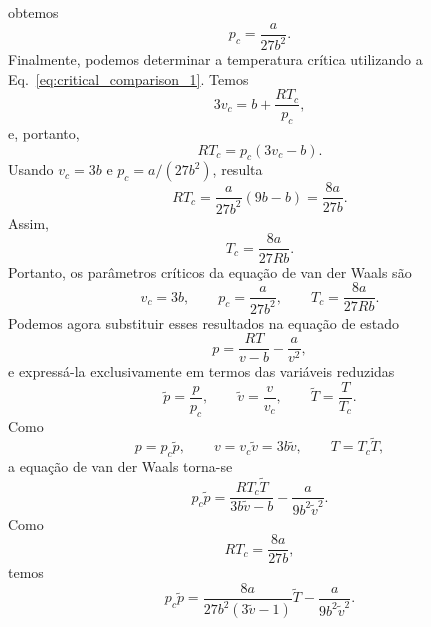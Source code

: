 \documentclass[11pt,a4paper]{article}
\begin{document}
%
obtemos
%
\begin{equation}
    \boxed{p_c=\frac{a}{27b^2}}.
\label{eq:pc}
\end{equation}
%
Finalmente, podemos determinar a temperatura crítica utilizando a
Eq.~\ref{eq:critical_comparison_1}. Temos
%
\begin{equation}
    3v_c=b+\frac{RT_c}{p_c},
\end{equation}
%
e, portanto,
%
\begin{equation}
    RT_c=p_c(3v_c-b).
\end{equation}
%
Usando $v_c=3b$ e $p_c=a/(27b^2)$, resulta
%
\begin{equation}
    RT_c
    =
    \frac{a}{27b^2}(9b-b)
    =
    \frac{8a}{27b}.
\end{equation}
%
Assim,
%
\begin{equation}
    \boxed{T_c=\frac{8a}{27Rb}}.
\label{eq:Tc}
\end{equation}
%
Portanto, os parâmetros críticos da equação de van der Waals são
%
\begin{equation}
    \boxed{
    v_c=3b,
    \qquad
    p_c=\frac{a}{27b^2},
    \qquad
    T_c=\frac{8a}{27Rb}.
    }
\label{eq:vdw_critical_parameters}
\end{equation}
%
Podemos agora substituir esses resultados na equação de estado
%
\begin{equation}
    p=\frac{RT}{v-b}-\frac{a}{v^2},
\end{equation}
%
e expressá-la exclusivamente em termos das variáveis reduzidas
%
\begin{equation}
    \tilde p=\frac{p}{p_c},
    \qquad
    \tilde v=\frac{v}{v_c},
    \qquad
    \tilde T=\frac{T}{T_c}.
\end{equation}
%
Como
%
\begin{equation}
    p=p_c\tilde p,
    \qquad
    v=v_c\tilde v=3b\tilde v,
    \qquad
    T=T_c\tilde T,
\end{equation}
%
a equação de van der Waals torna-se
%
\begin{equation}
    p_c\tilde p
    =
    \frac{RT_c\tilde T}{3b\tilde v-b}
    -
    \frac{a}{9b^2\tilde v^2}.
\end{equation}
%
Como
%
\begin{equation}
    RT_c=\frac{8a}{27b},
\end{equation}
%
temos
%
\begin{equation}
    p_c\tilde p
    =
    \frac{8a}{27b^2(3\tilde v-1)}\tilde T
    -
    \frac{a}{9b^2\tilde v^2}.
\end{equation}
\end{document}
